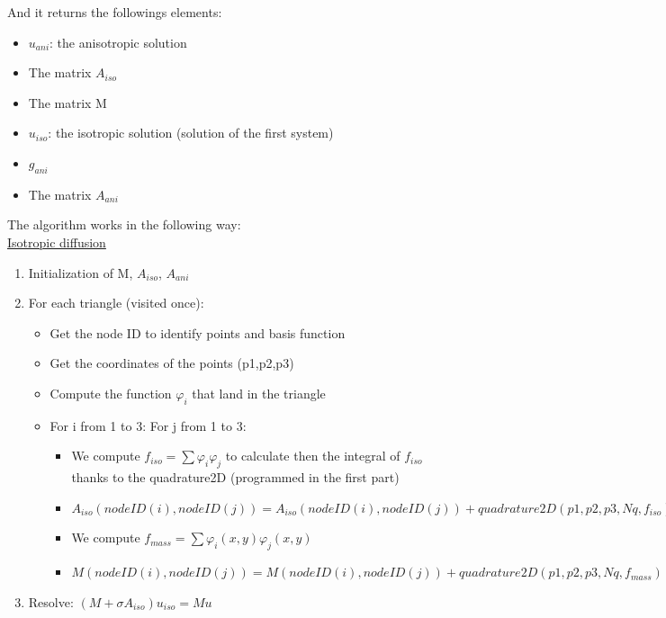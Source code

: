 \documentclass{report}
\renewcommand\phi{\varphi}
\begin{document}
And it returns the followings elements: %
\begin{itemize}
    
    \item 
    $u_{ani}$: the anisotropic solution
    \item
    The matrix $A_{iso}$
    \item
    The matrix M
    \item
   $ u_{iso}$: the isotropic solution (solution of the first system)
    \item
    $g_{ani}$
    \item
    The matrix $A_{ani}$
\end{itemize}



The algorithm works in the following way: \\

\underline{Isotropic diffusion}
\begin{enumerate}
    
    \item 
    Initialization of M, $A_{iso}$, $A_{ani}$
     \item 
     For each triangle (visited once):
     \begin{itemize}
          \item
          Get the node ID to identify points and basis function
          \item 
          Get the coordinates of the points (p1,p2,p3) 
          \item 
          Compute the function $\phi_i$ that land in the triangle
          \item 
          For i from 1 to 3: 
          For j from 1 to 3: 
          \begin{itemize}
          \item
              We compute $f_{iso} = \sum {\phi_i \phi_j}$ to calculate then the integral of $f_{iso}$ thanks to the quadrature2D (programmed in the first part) 
          \item
              $A_{iso}(nodeID(i),nodeID(j)) =  A_{iso}(nodeID(i),nodeID(j)) + quadrature2D (p1,p2,p3,Nq,f_{iso})$
          \item
              We compute $f_{mass} = \sum {\phi_i(x,y) \phi_j(x,y)}$
          \item
              $M(nodeID(i),nodeID(j)) =  M(nodeID(i),nodeID(j)) + quadrature2D(p1,p2,p3,Nq,f_{mass})$
          \end{itemize}
     \end{itemize}
     \item 
     Resolve: $(M + \sigma A_{iso}) u_{iso} = M u$
\end{enumerate}
\end{document}
